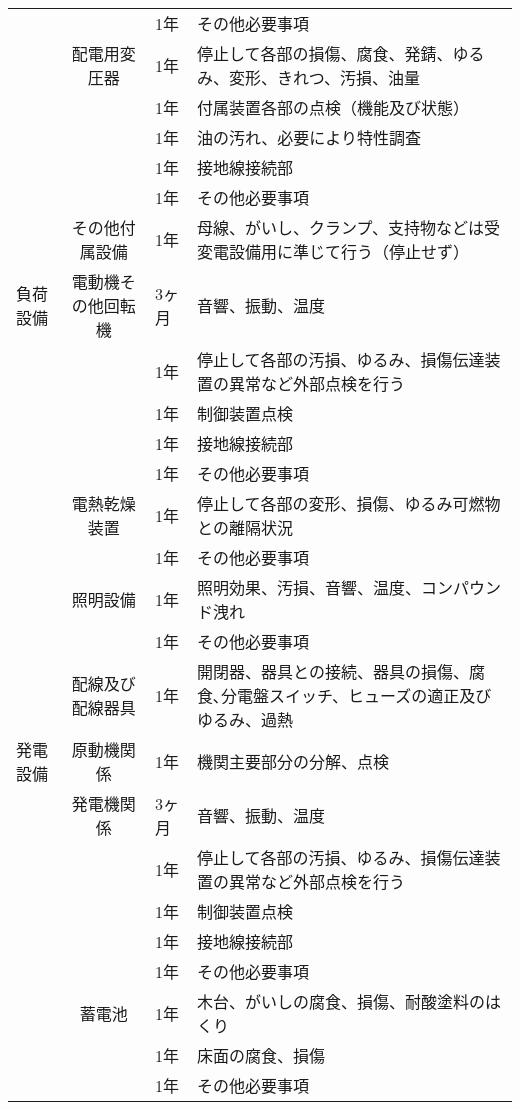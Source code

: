 \documentclass[10pt,a4paper,uplatex]{jsarticle}
\begin{document}
\begin{table}[b]
\begin{tabular}{|l|c|p{1cm}|p{10cm}|}
    &              & 1年 & その他必要事項  \\ \cline{2-4}
    &配電用変圧器   & 1年 & 停止して各部の損傷、腐食、発錆、ゆるみ、変形、きれつ、汚損、油量  \\
    &              & 1年 & 付属装置各部の点検（機能及び状態）  \\ 
    &              & 1年 & 油の汚れ、必要により特性調査  \\ 
    &              & 1年 & 接地線接続部  \\ 
    &              & 1年 & その他必要事項  \\ \cline{2-4}
    &その他付属設備 & 1年 & 母線、がいし、クランプ、支持物などは受変電設備用に準じて行う（停止せず）  \\ \cline{2-4}
    \hline 
負荷設備
    &電動機その他回転機& 3ヶ月 & 音響、振動、温度  \\
    &              & 1年 & 停止して各部の汚損、ゆるみ、損傷伝達装置の異常など外部点検を行う  \\
    &              & 1年 & 制御装置点検  \\
    &              & 1年 & 接地線接続部  \\
    &              & 1年 & その他必要事項  \\ \cline{2-4}
    &電熱乾燥装置     & 1年 & 停止して各部の変形、損傷、ゆるみ可燃物との離隔状況  \\
    &              & 1年 & その他必要事項  \\ \cline{2-4}
    &照明設備        & 1年 & 照明効果、汚損、音響、温度、コンパウンド洩れ  \\
    &              & 1年 & その他必要事項  \\ \cline{2-4}
    &配線及び配線器具   & 1年 & 開閉器、器具との接続、器具の損傷、腐食､分電盤スイッチ、ヒューズの適正及びゆるみ、過熱\\ \cline{2-4}
    \hline  
発電設備
    &原動機関係     & 1年 & 機関主要部分の分解、点検  \\\cline{2-4}
    &発電機関係     & 3ヶ月 & 音響、振動、温度  \\
    &              & 1年 & 停止して各部の汚損、ゆるみ、損傷伝達装置の異常など外部点検を行う  \\
    &              & 1年 & 制御装置点検  \\
    &              & 1年 & 接地線接続部  \\
    &              & 1年 & その他必要事項  \\ \cline{2-4}

    &蓄電池         & 1年 & 木台、がいしの腐食、損傷、耐酸塗料のはくり  \\
    &              & 1年 & 床面の腐食、損傷  \\
    &              & 1年 & その他必要事項\\\cline{2-4}\hline  
  \end{tabular}
\end{table}
\end{document}

